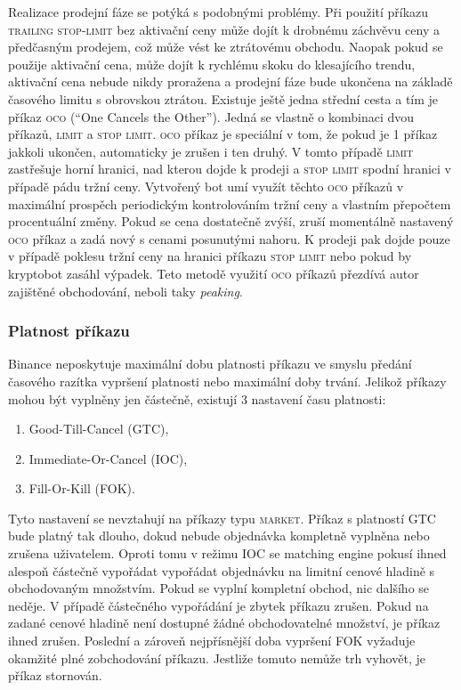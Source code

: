 Realizace prodejní fáze se potýká s podobnými problémy. Při použití příkazu \textsc{trailing stop-limit} bez aktivační ceny může dojít k drobnému záchvěvu ceny a předčasným prodejem, což může
vést ke ztrátovému obchodu. Naopak pokud se použije aktivační cena, může dojít k rychlému skoku do klesajícího trendu, aktivační cena nebude nikdy proražena a prodejní fáze bude ukončena na základě
časového limitu s obrovskou ztrátou. Existuje ještě jedna střední cesta a tím je příkaz \textsc{oco} (\enquote{One Cancels the Other}). Jedná se vlastně o kombinaci dvou příkazů, \textsc{limit} a
\textsc{stop limit}. \textsc{oco} příkaz je speciální v tom, že pokud je 1 příkaz jakkoli ukončen, automaticky je zrušen i ten druhý. V tomto případě \textsc{limit} zastřešuje horní hranici, nad
kterou dojde k prodeji a \textsc{stop limit} spodní hranici v případě pádu tržní ceny. Vytvořený bot umí využít těchto \textsc{oco} příkazů v maximální prospěch periodickým kontrolováním tržní ceny
a vlastním přepočtem procentuální změny. Pokud se cena dostatečně zvýší, zruší momentálně nastavený \textsc{oco} příkaz a zadá nový s cenami posunutými nahoru. K prodeji pak dojde pouze v případě poklesu tržní
ceny na hranici příkazu \textsc{stop limit} nebo pokud by kryptobot zasáhl výpadek. Teto metodě využití \textsc{oco} příkazů přezdívá autor zajištěné obchodování, neboli taky \emph{peaking}.

\subsubsection{Platnost příkazu}
Binance neposkytuje maximální dobu platnosti příkazu ve smyslu předání časového razítka vypršení platnosti nebo maximální doby trvání. Jelikož příkazy mohou být vyplněny jen částečně, existují
3 nastavení času platnosti:
\begin{enumerate}
    \item Good-Till-Cancel (GTC),
    \item Immediate-Or-Cancel (IOC),
    \item Fill-Or-Kill (FOK).
\end{enumerate}
Tyto nastavení se nevztahují na příkazy typu \textsc{market}. Příkaz s platností GTC bude platný tak dlouho, dokud nebude objednávka kompletně vyplněna nebo zrušena uživatelem. Oproti tomu v
režimu IOC se matching engine pokusí ihned alespoň částečně vypořádat vypořádat objednávku na limitní cenové hladině s obchodovaným množstvím. Pokud se vyplní kompletní obchod, nic dalšího 
se neděje. V případě částečného vypořádání je zbytek příkazu zrušen. Pokud na zadané cenové hladině není dostupné žádné obchodovatelné množství, je příkaz ihned zrušen.
Poslední a zároveň nejpřísnější doba vypršení FOK vyžaduje okamžité plné zobchodování příkazu. Jestliže tomuto nemůže trh vyhovět, je příkaz stornován.

